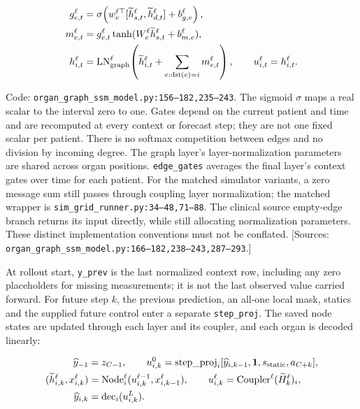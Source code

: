 \[
\begin{aligned}
g_{e,t}^\ell&=\sigma\!\left(w_{e}^{\ell\top}[\widetilde h_{s,t}^\ell,\widetilde h_{d,t}^\ell]+b_{g,e}^\ell\right),\\
m_{e,t}^\ell&=g_{e,t}^\ell\tanh(W_e^\ell\widetilde h_{s,t}^\ell+b_{m,e}^\ell),\\
h_{i,t}^\ell&=\operatorname{LN}_{\rm graph}^\ell\!\left(\widetilde h_{i,t}^\ell+
 \sum_{e:\operatorname{dst}(e)=i}m_{e,t}^\ell\right),\qquad
u_{i,t}^{\ell}=h_{i,t}^{\ell}.
\end{aligned}
\]


Code: \texttt{organ\_\allowbreak{}graph\_\allowbreak{}ssm\_\allowbreak{}model.\allowbreak{}py:\allowbreak{}156–\allowbreak{}182,\allowbreak{}235–\allowbreak{}243}. The sigmoid \(\sigma\) maps a real scalar to the interval zero to one. Gates depend on the current patient and time and are recomputed at every context or forecast step; they are not one fixed scalar per patient. There is no softmax competition between edges and no division by incoming degree. The graph layer's layer-normalization parameters are shared across organ positions. \texttt{edge\_\allowbreak{}gates} averages the final layer's context gates over time for each patient. For the matched simulator variants, a zero message sum still passes through coupling layer normalization; the matched wrapper is \texttt{sim\_grid\_runner.py:34--48,71--88}. The clinical source empty-edge branch returns its input directly, while still allocating normalization parameters. These distinct implementation conventions must not be conflated. [Sources: \texttt{organ\_\allowbreak{}graph\_\allowbreak{}ssm\_\allowbreak{}model.\allowbreak{}py:\allowbreak{}166–\allowbreak{}182,\allowbreak{}238–\allowbreak{}243,\allowbreak{}287–\allowbreak{}293}.]

At rollout start, \texttt{y\_\allowbreak{}prev} is the last normalized context row, including any zero placeholders for missing measurements; it is not the last observed value carried forward. For future step \(k\), the previous prediction, an all-one local mask, statics and the supplied future control enter a separate \texttt{step\_\allowbreak{}proj}. The saved node states are updated through each layer and its coupler, and each organ is decoded linearly:

\[
\begin{aligned}
\widehat y_{-1}&=z_{C-1},\qquad
u_{i,k}^{0}=\mathrm{step\_proj}_i[\widehat y_{i,k-1},\mathbf1,s_{\rm static},a_{C+k}],\\
(\widetilde h_{i,k}^{\ell},x_{i,k}^{\ell})&=\mathrm{Node}_i^\ell(u_{i,k}^{\ell-1},x_{i,k-1}^{\ell}),\qquad
u_{i,k}^{\ell}=\mathrm{Coupler}^\ell(\widetilde H_k^\ell)_i,\\
\widehat y_{i,k}&=\mathrm{dec}_i(u_{i,k}^{L}).
\end{aligned}
\]


